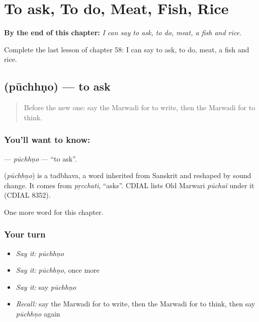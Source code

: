 
\chapter{To ask, To do, Meat, Fish, Rice}
\label{ch:mw-to-ask-to-do-meat-fish-rice}

\begin{chapteropening}
\textbf{By the end of this chapter:} \emph{I can say to ask, to do, meat, a fish and rice.}

Complete the last lesson of chapter 58: I can say to ask, to do, meat, a fish and rice.
\end{chapteropening}

\section[\texorpdfstring{\mw{पूछणो} (pūchhṇo)}{पूछणो (pūchhṇo)}]{ (pūchhṇo) — to ask}

\label{lesson:MW-C58-puchhno}



\begin{quote}
Before the new one: say the Marwadi for to write, then the Marwadi for to think.
\end{quote}

\subsection*{You'll want to know: }
\textbf{} — \emph{pūchhṇo} — \textquotedblleft{}to ask\textquotedblright{}.

\begin{cousinweb}
\textbf{} (\emph{pūchhṇo}) is a tadbhava, a word inherited from Sanskrit and reshaped by sound change. It comes from \emph{pṛcchati}, \textquotedblleft{}asks\textquotedblright{}. CDIAL lists Old Marwari \emph{pūchaï} under it (CDIAL 8352).
\end{cousinweb}

\begin{grammarlens}[title={What you've built}]
One more word for this chapter.
\end{grammarlens}

\subsection*{Your turn}
\begin{itemize}
\raggedright
  \item \emph{Say it:} \emph{pūchhṇo}
  \item \emph{Say it:} \emph{pūchhṇo}, once more
  \item \emph{Say it:} say \emph{pūchhṇo}
  \item \emph{Recall:} say the Marwadi for to write, then the Marwadi for to think, then say \emph{pūchhṇo} again
\end{itemize}

